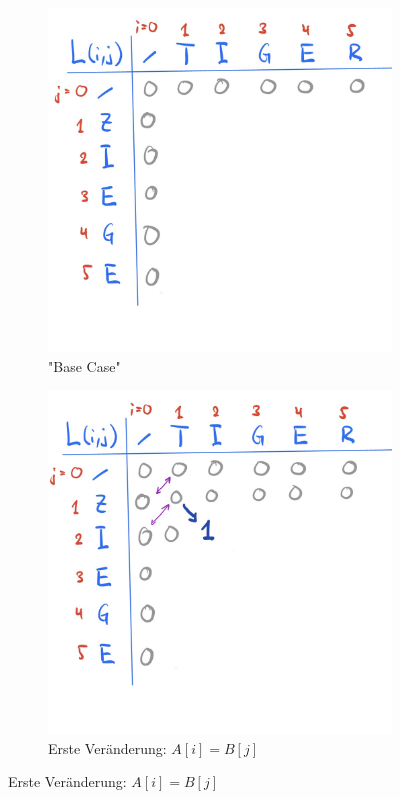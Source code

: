 \documentclass[a4paper]{article}
\begin{document}
\begin{figure}[h]
\centering
\begin{subfigure}{0.45\textwidth}
    \includegraphics[width=\textwidth]{Pictures/LGT0.jpg}
        \caption{"Base Case"}
        \label{fig:LGT00}
\end{subfigure}
\hfill
\begin{subfigure}{0.45\textwidth}
 \includegraphics[width=\textwidth]{Pictures/LGT1.jpg}  
 \caption{Erste Veränderung: $A[i] = B[j]$}
        \label{fig:LGT01}
\end{subfigure}


\end{figure}
\end{document}
